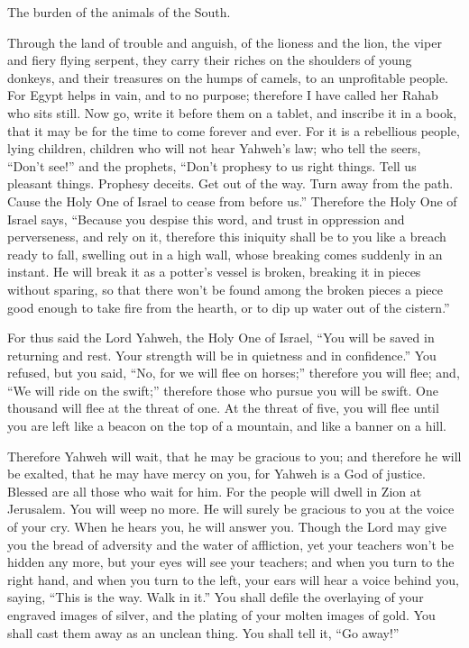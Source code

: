  The burden of the animals of the South.

Through the land of trouble and anguish, of the lioness and the lion,
the viper and fiery flying serpent, they carry their riches on the
shoulders of young donkeys, and their treasures on the humps of camels,
to an unprofitable people.  For Egypt helps in vain, and
to no purpose; therefore I have called her Rahab who sits still.
 Now go, write it before them on a tablet, and inscribe it
in a book, that it may be for the time to come forever and ever.
 For it is a rebellious people, lying children, children
who will not hear Yahweh's law;  who tell the seers,
``Don't see!'' and the prophets, ``Don't prophesy to us right things.
Tell us pleasant things. Prophesy deceits.  Get out of
the way. Turn away from the path. Cause the Holy One of Israel to cease
from before us.''  Therefore the Holy One of Israel says,
``Because you despise this word, and trust in oppression and
perverseness, and rely on it,  therefore this iniquity
shall be to you like a breach ready to fall, swelling out in a high
wall, whose breaking comes suddenly in an instant.  He
will break it as a potter's vessel is broken, breaking it in pieces
without sparing, so that there won't be found among the broken pieces a
piece good enough to take fire from the hearth, or to dip up water out
of the cistern.''

 For thus said the Lord Yahweh, the Holy One of Israel,
``You will be saved in returning and rest. Your strength will be in
quietness and in confidence.'' You refused,  but you
said, ``No, for we will flee on horses;'' therefore you will flee; and,
``We will ride on the swift;'' therefore those who pursue you will be
swift.  One thousand will flee at the threat of one. At
the threat of five, you will flee until you are left like a beacon on
the top of a mountain, and like a banner on a hill.

 Therefore Yahweh will wait, that he may be gracious to
you; and therefore he will be exalted, that he may have mercy on you,
for Yahweh is a God of justice. Blessed are all those who wait for him.
 For the people will dwell in Zion at Jerusalem. You will
weep no more. He will surely be gracious to you at the voice of your
cry. When he hears you, he will answer you.  Though the
Lord may give you the bread of adversity and the water of affliction,
yet your teachers won't be hidden any more, but your eyes will see your
teachers;  and when you turn to the right hand, and when
you turn to the left, your ears will hear a voice behind you, saying,
``This is the way. Walk in it.''  You shall defile the
overlaying of your engraved images of silver, and the plating of your
molten images of gold. You shall cast them away as an unclean thing. You
shall tell it, ``Go away!''

